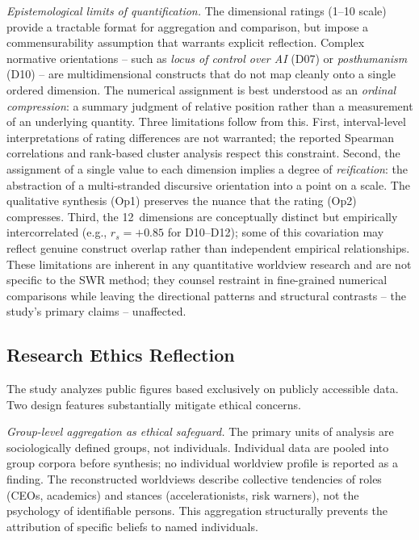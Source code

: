 \documentclass[12pt,a4paper]{article}
\begin{document}
\emph{Epistemological limits of quantification.} The dimensional ratings (1--10 scale) provide a tractable format for aggregation and comparison, but impose a commensurability assumption that warrants explicit reflection. Complex normative orientations -- such as \emph{locus of control over AI} (D07) or \emph{posthumanism} (D10) -- are multidimensional constructs that do not map cleanly onto a single ordered dimension. The numerical assignment is best understood as an \emph{ordinal compression}: a summary judgment of relative position rather than a measurement of an underlying quantity. Three limitations follow from this. First, interval-level interpretations of rating differences are not warranted; the reported Spearman correlations and rank-based cluster analysis respect this constraint. Second, the assignment of a single value to each dimension implies a degree of \emph{reification}: the abstraction of a multi-stranded discursive orientation into a point on a scale. The qualitative synthesis (Op1) preserves the nuance that the rating (Op2) compresses. Third, the 12~dimensions are conceptually distinct but empirically intercorrelated (e.g., $r_s = +0.85$ for D10--D12); some of this covariation may reflect genuine construct overlap rather than independent empirical relationships. These limitations are inherent in any quantitative worldview research and are not specific to the SWR method; they counsel restraint in fine-grained numerical comparisons while leaving the directional patterns and structural contrasts -- the study's primary claims -- unaffected.

\subsection{Research Ethics Reflection}

The study analyzes public figures based exclusively on publicly accessible data. Two design features substantially mitigate ethical concerns.

\emph{Group-level aggregation as ethical safeguard.} The primary units of analysis are sociologically defined groups, not individuals. Individual data are pooled into group corpora before synthesis; no individual worldview profile is reported as a finding. The reconstructed worldviews describe collective tendencies of roles (CEOs, academics) and stances (accelerationists, risk warners), not the psychology of identifiable persons. This aggregation structurally prevents the attribution of specific beliefs to named individuals.
\end{document}
